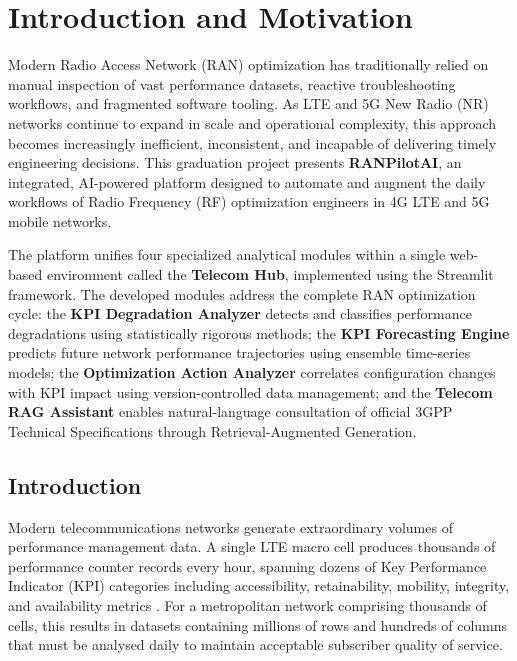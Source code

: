 \chapter{Introduction and Motivation}
\label{chap:introduction}

Modern Radio Access Network (RAN) optimization has traditionally relied on manual inspection of vast performance datasets, reactive troubleshooting workflows, and fragmented software tooling. As LTE and 5G New Radio (NR) networks continue to expand in scale and operational complexity, this approach becomes increasingly inefficient, inconsistent, and incapable of delivering timely engineering decisions. This graduation project presents \textbf{RANPilotAI}, an integrated, AI-powered platform designed to automate and augment the daily workflows of Radio Frequency (RF) optimization engineers in 4G LTE and 5G mobile networks.

The platform unifies four specialized analytical modules within a single web-based environment called the \textbf{Telecom Hub}, implemented using the Streamlit framework. The developed modules address the complete RAN optimization cycle: the \textbf{KPI Degradation Analyzer} detects and classifies performance degradations using statistically rigorous methods; the \textbf{KPI Forecasting Engine} predicts future network performance trajectories using ensemble time-series models; the \textbf{Optimization Action Analyzer} correlates configuration changes with KPI impact using version-controlled data management; and the \textbf{Telecom RAG Assistant} enables natural-language consultation of official 3GPP Technical Specifications through Retrieval-Augmented Generation.

\section{Introduction}

Modern telecommunications networks generate extraordinary volumes of performance management data. A single LTE macro cell produces thousands of performance counter records every hour, spanning dozens of Key Performance Indicator (KPI) categories including accessibility, retainability, mobility, integrity, and availability metrics \cite{sesia2011}. For a metropolitan network comprising thousands of cells, this results in datasets containing millions of rows and hundreds of columns that must be analysed daily to maintain acceptable subscriber quality of service.

